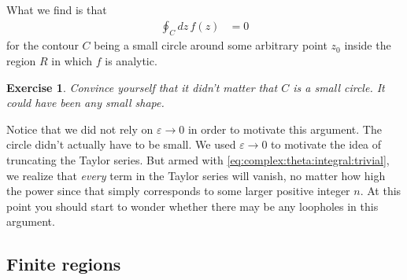 \documentclass[
  11pt,
	colorful,
	raggedright,
]{tufte-style-thesis-flip}
\newtheorem{exercise}{Exercise}[section]
\begin{document}
What we find is that 
\begin{align}
  \oint_C dz\, f(z) &= 0
\end{align}
for the contour $C$ being a small circle around some arbitrary point $z_0$ inside the region $R$ in which $f$ is analytic. 
\begin{exercise}
Convince yourself that it didn't matter that $C$ is a small circle. It could have been any small shape. 
\end{exercise}
Notice that we did not rely on $\varepsilon\to 0$ in order to motivate this argument. The circle didn't actually have to be small. We used $\varepsilon\to 0$ to motivate the idea of truncating the Taylor series. But armed with \eqref{eq:complex:theta:integral:trivial}, we realize that \emph{every} term in the Taylor series will vanish, no matter how high the power since that simply corresponds to some larger positive integer $n$. At this point you should start to wonder whether there may be any loopholes in this argument.




\subsection{Finite regions}
\end{document}
